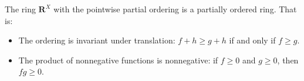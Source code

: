 The ring $\mathbf{R}^X$ with the pointwise partial ordering is a partially ordered ring. That is:
\begin{itemize}
\item The ordering is invariant under translation: $f + h \geq g + h$ if and only if $f \geq g$.
\item The product of nonnegative functions is nonnegative: if $f \geq 0$ and $g \geq 0$, then $fg \geq 0$.
\end{itemize}
